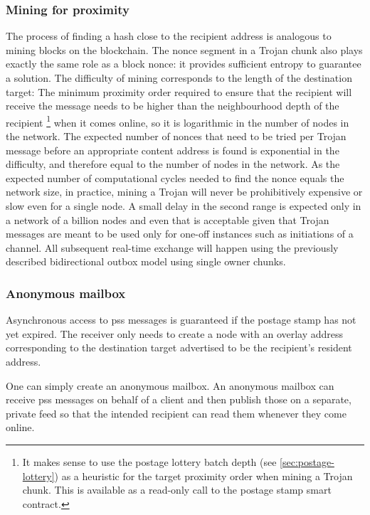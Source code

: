 \subsubsection{Mining for proximity}

The process of finding a hash close to the recipient address is analogous to mining blocks on the blockchain. The nonce segment in a Trojan chunk also plays exactly the same role as a block nonce: it provides sufficient entropy to guarantee a solution. The difficulty of mining corresponds to the length of the destination target: The minimum proximity order required to ensure that the recipient will receive the message needs to be higher than the neighbourhood depth of the recipient%
%
\footnote{It makes sense to use the postage lottery batch depth (see \ref{sec:postage-lottery}) as a heuristic for the target proximity order when mining a Trojan chunk. This is available as a read-only call to the postage stamp smart contract.}
%
when it comes online, so it is logarithmic in the number of nodes in the network. The expected number of nonces that need to be tried per Trojan message before an appropriate content address is found is exponential in the difficulty, and therefore equal to the number of nodes in the network. As the expected number of computational cycles needed to find the nonce equals the network size, in practice, mining a Trojan will never be prohibitively expensive or slow even for a single node. A small delay in the second range is expected only in a network of a billion nodes and even that is acceptable given that Trojan messages are meant to be used only for one-off instances such as initiations of a channel. All subsequent real-time exchange will happen using the previously described bidirectional outbox model using single owner chunks.


\subsubsection{Anonymous mailbox}

Asynchronous access to pss messages is guaranteed if the postage stamp has not yet expired. The receiver only needs to create a node with an overlay address corresponding to the destination target advertised to be the recipient's resident address.    

One can simply create an anonymous mailbox. An anonymous mailbox can receive pss messages on behalf of a client and then publish those on a separate, private feed so that the intended recipient can read them whenever they come online.

